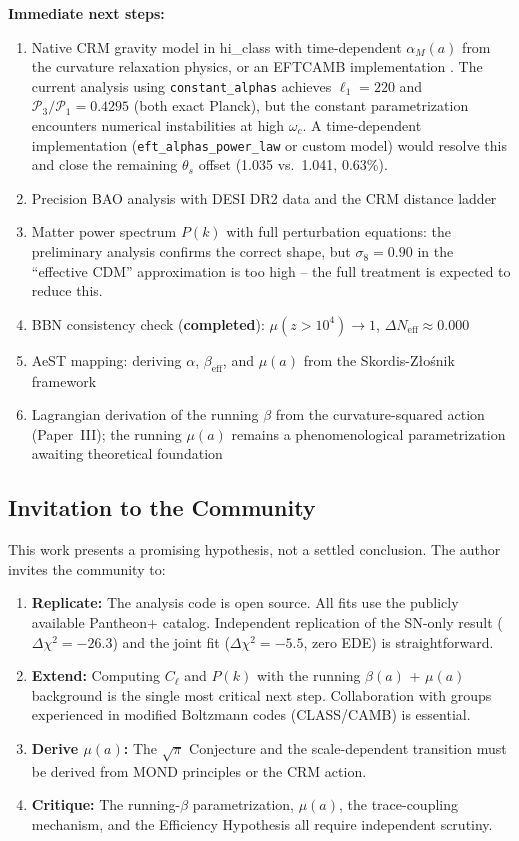 \documentclass[aps,prd,twocolumn,superscriptaddress,nofootinbib,floatfix]{revtex4-2}
\begin{document}
\textbf{Immediate next steps:}
\begin{enumerate}
\item Native CRM gravity model in hi\_class with time-dependent $\alpha_M(a)$ from the curvature relaxation physics, or an EFTCAMB implementation \cite{Hu2014}. The current analysis using \texttt{constant\_alphas} achieves $\ell_1 = 220$ and $\mathcal{P}_3/\mathcal{P}_1 = 0.4295$ (both exact Planck), but the constant parametrization encounters numerical instabilities at high $\omega_c$. A time-dependent implementation (\texttt{eft\_alphas\_power\_law} or custom model) would resolve this and close the remaining $\theta_s$ offset (1.035 vs.\ 1.041, 0.63\%).
\item Precision BAO analysis with DESI DR2 data and the CRM distance ladder
\item Matter power spectrum $P(k)$ with full perturbation equations: the preliminary analysis confirms the correct shape, but $\sigma_8 = 0.90$ in the ``effective CDM'' approximation is too high -- the full treatment is expected to reduce this.
\item BBN consistency check (\textbf{completed}): $\mu(z > 10^4) \to 1$, $\Delta N_{\mathrm{eff}} \approx 0.000$ \cite{Pitrou2018}
\item AeST mapping: deriving $\alpha$, $\beta_{\mathrm{eff}}$, and $\mu(a)$ from the Skordis-Z{\l}o\'snik framework
\item Lagrangian derivation of the running $\beta$ from the curvature-squared action (Paper~III); the running $\mu(a)$ remains a phenomenological parametrization awaiting theoretical foundation
\end{enumerate}

\subsection{Invitation to the Community}

This work presents a promising hypothesis, not a settled conclusion. The author invites the community to:
\begin{enumerate}
\item \textbf{Replicate:} The analysis code is open source. All fits use the publicly available Pantheon+ catalog. Independent replication of the SN-only result ($\Delta\chi^2 = -26.3$) and the joint fit ($\Delta\chi^2 = -5.5$, zero EDE) is straightforward.
\item \textbf{Extend:} Computing $C_\ell$ and $P(k)$ with the running $\beta(a)$ + $\mu(a)$ background is the single most critical next step. Collaboration with groups experienced in modified Boltzmann codes (CLASS/CAMB) is essential.
\item \textbf{Derive $\mu(a)$:} The $\sqrt{\pi}$ Conjecture and the scale-dependent transition must be derived from MOND principles or the CRM action.
\item \textbf{Critique:} The running-$\beta$ parametrization, $\mu(a)$, the trace-coupling mechanism, and the Efficiency Hypothesis all require independent scrutiny.
\end{enumerate}
\end{document}
